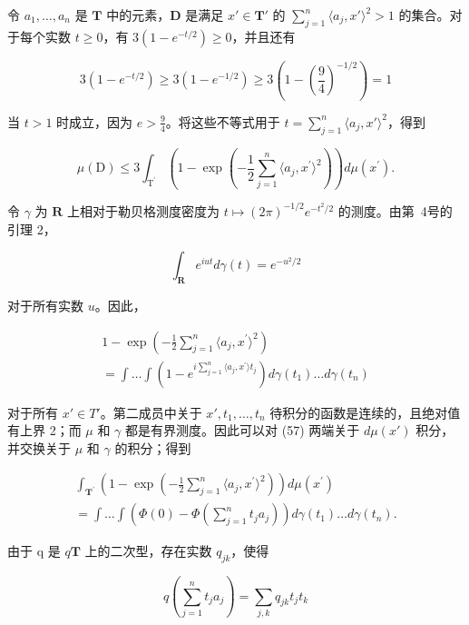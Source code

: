 令 \(a_1, \ldots, a_n\) 是 \(\mathbf{T}\) 中的元素，\(\mathbf{D}\) 是满足 \(x' \in \mathbf{T}'\) 的 \(\sum_{j=1}^{n} \langle a_j, x' \rangle^2 > 1\) 的集合。对于每个实数 \(t \geqslant 0\)，有 \(3(1 - e^{-t/2}) \geqslant 0\)，并且还有

\[
3 (1 - e ^ {- t / 2}) \geqslant 3 (1 - e ^ {- 1 / 2}) \geqslant 3 \left(1 - \left(\frac {9}{4}\right) ^ {- 1 / 2}\right) = 1
\]

当 \(t > 1\) 时成立，因为 \(e > \frac{9}{4}\)。将这些不等式用于 \(t = \sum_{j=1}^{n} \langle a_j, x' \rangle^2\)，得到

\[
\mu (\mathrm{D}) \leqslant 3 \int_ {\mathrm{T} ^ {\prime}} \left(1 - \exp \left(- \frac {1}{2} \sum_ {j = 1} ^ {n} \langle a _ {j}, x ^ {\prime} \rangle^ {2}\right)\right) d \mu (x ^ {\prime}).\tag{56}
\]

令 \(\gamma\) 为 \(\mathbf{R}\) 上相对于勒贝格测度密度为 \(t \mapsto (2\pi)^{-1/2} e^{-t^2/2}\) 的测度。由第~4号的引理 2，

\[
\int_ {\mathbf {R}} e ^ {i u t} d \gamma (t) = e ^ {- u ^ {2} / 2}
\]

对于所有实数 \(u\)。因此，

\[
\begin{array}{l} 1 - \exp \left(- \frac {1}{2} \sum_ {j = 1} ^ {n} \langle a _ {j}, x ^ {\prime} \rangle^ {2}\right) \\ = \int \dots \int \left(1 - e ^ {i \sum_ {j = 1} ^ {n} \langle a _ {j}, x ^ {\prime} \rangle t _ {j}}\right) d \gamma (t _ {1}) \dots d \gamma (t _ {n}) \end{array}\tag{57}
\]

对于所有 \(x' \in T'\)。第二成员中关于 \(x', t_{1}, \ldots, t_{n}\) 待积分的函数是连续的，且绝对值有上界 2；而 \(\mu\) 和 \(\gamma\) 都是有界测度。因此可以对 (57) 两端关于 \(d\mu(x')\) 积分，并交换关于 \(\mu\) 和 \(\gamma\) 的积分；得到

\[
\begin{array}{l} \int_ {\mathbf {T} ^ {\prime}} \left(1 - \exp \left(- \frac {1}{2} \sum_ {j = 1} ^ {n} \langle a _ {j}, x ^ {\prime} \rangle^ {2}\right)\right) d \mu (x ^ {\prime}) \\ = \int \dots \int \left(\Phi (0) - \Phi \left(\sum_ {j = 1} ^ {n} t _ {j} a _ {j}\right)\right) d \gamma (t _ {1}) \dots d \gamma (t _ {n}). \end{array}\tag{58}
\]

由于 q 是 \(q\)\(\mathbf{T}\) 上的二次型，存在实数 \(q_{jk}\)，使得

\[
q \left(\sum_ {j = 1} ^ {n} t _ {j} a _ {j}\right) = \sum_ {j, k} q _ {j k} t _ {j} t _ {k}
\]

